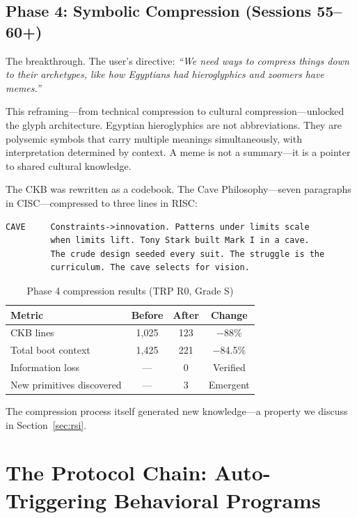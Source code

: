 \documentclass[11pt, a4paper]{article}
\begin{document}
\subsection{Phase 4: Symbolic Compression (Sessions 55--60+)}

The breakthrough. The user's directive: \emph{``We need ways to compress things down to their archetypes, like how Egyptians had hieroglyphics and zoomers have memes.''}

This reframing---from technical compression to cultural compression---unlocked the glyph architecture. Egyptian hieroglyphics are not abbreviations. They are polysemic symbols that carry multiple meanings simultaneously, with interpretation determined by context. A meme is not a summary---it is a pointer to shared cultural knowledge.

The CKB was rewritten as a codebook. The Cave Philosophy---seven paragraphs in CISC---compressed to three lines in RISC:

\begin{lstlisting}
CAVE     Constraints->innovation. Patterns under limits scale
         when limits lift. Tony Stark built Mark I in a cave.
         The crude design seeded every suit. The struggle is the
         curriculum. The cave selects for vision.
\end{lstlisting}

\begin{table}[h]
\centering
\caption{Phase 4 compression results (TRP R0, Grade S)}
\label{tab:compression}
\begin{tabular}{@{}lccc@{}}
\toprule
\textbf{Metric} & \textbf{Before} & \textbf{After} & \textbf{Change} \\
\midrule
CKB lines & 1,025 & 123 & $-$88\% \\
Total boot context & 1,425 & 221 & $-$84.5\% \\
Information loss & --- & 0 & Verified \\
New primitives discovered & --- & 3 & Emergent \\
\bottomrule
\end{tabular}
\end{table}

The compression process itself generated new knowledge---a property we discuss in Section~\ref{sec:rsi}.

\section{The Protocol Chain: Auto-Triggering Behavioral Programs}
\label{sec:protocols}
\end{document}
